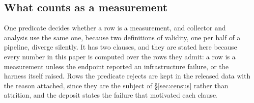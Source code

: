 \subsection{What counts as a measurement}

One predicate decides whether a row is a measurement, and collector and analysis use the same one, because
two definitions of validity, one per half of a pipeline, diverge silently. It has two clauses, and they are stated
here because every number in this paper is computed over the rows they admit: a row is a measurement
unless the endpoint reported an infrastructure failure, or the harness itself raised. Rows the predicate
rejects are kept in the released data with the reason attached, since they are the subject of
\S\ref{sec:census} rather than attrition, and the deposit states the failure that motivated each clause.


